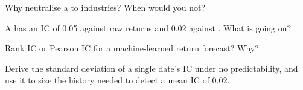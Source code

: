 \begin{interviewq}\label{iq:rs:anatomy-of-a-predictor:3}
Why neutralise a  to industries? When would you not?
\end{interviewq}

\begin{interviewq}\label{iq:rs:anatomy-of-a-predictor:4}
A  has an IC of 0.05 against raw returns and 0.02 against . What is going on?
\end{interviewq}

\begin{interviewq}\label{iq:rs:anatomy-of-a-predictor:5}
Rank IC or Pearson IC for a machine-learned return forecast? Why?
\end{interviewq}

\begin{interviewq}\label{iq:rs:anatomy-of-a-predictor:6}
Derive the standard deviation of a single date's IC under no predictability, and use it to size the history needed to detect a
mean IC of 0.02.
\end{interviewq}
